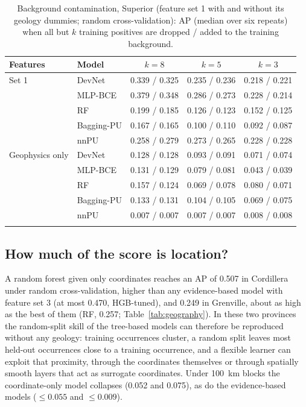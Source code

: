 \documentclass[pdflatex,sn-apa]{sn-jnl}
\begin{document}
\begin{table}[t]
\caption{Background contamination, Superior (feature set 1 with and without its geology dummies; random cross-validation): AP (median over six repeats) when all but $k$ training positives are dropped / added to the training background.}\label{tab:contamination}
\footnotesize
\begin{tabular*}{\textwidth}{@{\extracolsep\fill}llccc}
\toprule
Features & Model & $k = 8$ & $k = 5$ & $k = 3$ \\
\midrule
Set 1 & DevNet & 0.339 / 0.325 & 0.235 / 0.236 & 0.218 / 0.221 \\
 & MLP-BCE & 0.379 / 0.348 & 0.286 / 0.273 & 0.228 / 0.214 \\
 & RF & 0.199 / 0.185 & 0.126 / 0.123 & 0.152 / 0.125 \\
 & Bagging-PU & 0.167 / 0.165 & 0.100 / 0.110 & 0.092 / 0.087 \\
 & nnPU & 0.258 / 0.279 & 0.273 / 0.265 & 0.228 / 0.228 \\
\addlinespace
Geophysics only & DevNet & 0.128 / 0.128 & 0.093 / 0.091 & 0.071 / 0.074 \\
 & MLP-BCE & 0.131 / 0.129 & 0.079 / 0.081 & 0.043 / 0.039 \\
 & RF & 0.157 / 0.124 & 0.069 / 0.078 & 0.080 / 0.071 \\
 & Bagging-PU & 0.133 / 0.131 & 0.104 / 0.105 & 0.069 / 0.075 \\
 & nnPU & 0.007 / 0.007 & 0.007 / 0.007 & 0.008 / 0.008 \\
\botrule
\end{tabular*}
\end{table}

\subsection{How much of the score is location?}\label{sec:res-geography}

A random forest given only coordinates reaches an AP of 0.507 in Cordillera under random cross-validation, higher than any evidence-based model with feature set 3 (at most 0.470, HGB-tuned), and 0.249 in Grenville, about as high as the best of them (RF, 0.257; Table~\ref{tab:geography}). In these two provinces the random-split skill of the tree-based models can therefore be reproduced without any geology: training occurrences cluster, a random split leaves most held-out occurrences close to a training occurrence, and a flexible learner can exploit that proximity, through the coordinates themselves or through spatially smooth layers that act as surrogate coordinates. Under 100~km blocks the coordinate-only model collapses (0.052 and 0.075), as do the evidence-based models ($\leq 0.055$ and $\leq 0.009$).
\end{document}

